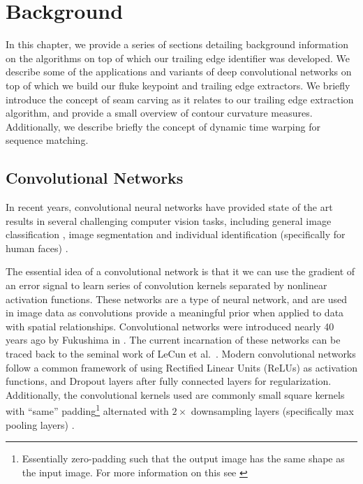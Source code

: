  
\chapter{Background} \label{sec:background}

In this chapter, we provide a series of sections detailing background information on the algorithms on top of which our trailing edge identifier was developed.
We describe some of the applications and variants of deep convolutional networks on top of which we build our fluke keypoint and trailing edge extractors.
We briefly introduce the concept of seam carving as it relates to our trailing edge extraction algorithm, and provide a small overview of contour curvature measures.
Additionally, we describe briefly the concept of dynamic time warping for sequence matching.

\section{Convolutional Networks}

In recent years, convolutional neural networks have provided state of the art results in several challenging computer vision tasks, including general image classification \cite{krizhevsky2012imagenet, szegedy2015going}, image segmentation \cite{long2015fully, chen2014semantic} and individual identification (specifically for human faces) \cite{fan2014learning, schroff2015facenet}.

The essential idea of a convolutional network is that it we can use the gradient of an error signal to learn series of convolution kernels separated by nonlinear activation functions.
These networks are a type of neural network, and are used in image data as convolutions provide a meaningful prior when applied to data with spatial relationships.
Convolutional networks were introduced nearly 40 years ago by Fukushima in \cite{fukushima1979neural}.
The current incarnation of these networks can be traced back to the seminal work of LeCun et al.\ \cite{lecun1998gradient}.
Modern convolutional networks follow a common framework of using Rectified Linear Units (ReLUs) as activation functions, and Dropout \cite{hinton2012improving} layers after fully connected layers for regularization.
Additionally, the convolutional kernels used are commonly small square kernels with ``same'' padding\footnote{Essentially zero-padding such that the output image has the same shape as the input image. For more information on this see \cite{dumoulin2016guide}} alternated with $2\times$ downsampling layers (specifically max pooling layers) \cite{simonyan2014very, sermanet2013overfeat, krizhevsky2012imagenet}.

